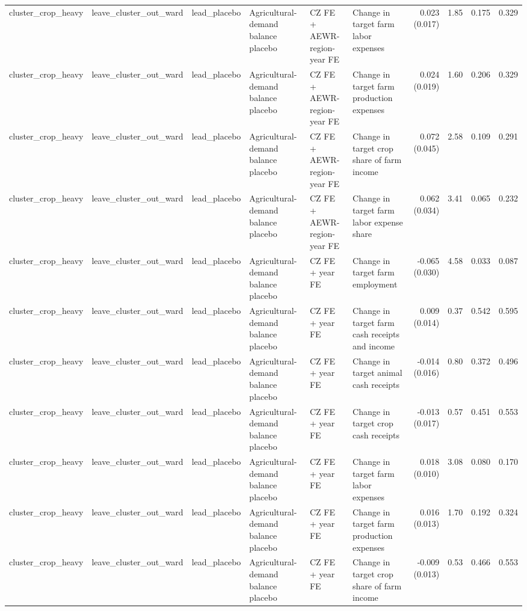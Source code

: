 \begin{tabular}{llllllrrrr}
cluster_crop_heavy & leave_cluster_out_ward & lead_placebo & Agricultural-demand balance placebo & CZ FE + AEWR-region-year FE & Change in target farm labor expenses & 0.023 (0.017) & 1.85 & 0.175 & 0.329 \\
cluster_crop_heavy & leave_cluster_out_ward & lead_placebo & Agricultural-demand balance placebo & CZ FE + AEWR-region-year FE & Change in target farm production expenses & 0.024 (0.019) & 1.60 & 0.206 & 0.329 \\
cluster_crop_heavy & leave_cluster_out_ward & lead_placebo & Agricultural-demand balance placebo & CZ FE + AEWR-region-year FE & Change in target crop share of farm income & 0.072 (0.045) & 2.58 & 0.109 & 0.291 \\
cluster_crop_heavy & leave_cluster_out_ward & lead_placebo & Agricultural-demand balance placebo & CZ FE + AEWR-region-year FE & Change in target farm labor expense share & 0.062 (0.034) & 3.41 & 0.065 & 0.232 \\
cluster_crop_heavy & leave_cluster_out_ward & lead_placebo & Agricultural-demand balance placebo & CZ FE + year FE & Change in target farm employment & -0.065 (0.030) & 4.58 & 0.033 & 0.087 \\
cluster_crop_heavy & leave_cluster_out_ward & lead_placebo & Agricultural-demand balance placebo & CZ FE + year FE & Change in target farm cash receipts and income & 0.009 (0.014) & 0.37 & 0.542 & 0.595 \\
cluster_crop_heavy & leave_cluster_out_ward & lead_placebo & Agricultural-demand balance placebo & CZ FE + year FE & Change in target animal cash receipts & -0.014 (0.016) & 0.80 & 0.372 & 0.496 \\
cluster_crop_heavy & leave_cluster_out_ward & lead_placebo & Agricultural-demand balance placebo & CZ FE + year FE & Change in target crop cash receipts & -0.013 (0.017) & 0.57 & 0.451 & 0.553 \\
cluster_crop_heavy & leave_cluster_out_ward & lead_placebo & Agricultural-demand balance placebo & CZ FE + year FE & Change in target farm labor expenses & 0.018 (0.010) & 3.08 & 0.080 & 0.170 \\
cluster_crop_heavy & leave_cluster_out_ward & lead_placebo & Agricultural-demand balance placebo & CZ FE + year FE & Change in target farm production expenses & 0.016 (0.013) & 1.70 & 0.192 & 0.324 \\
cluster_crop_heavy & leave_cluster_out_ward & lead_placebo & Agricultural-demand balance placebo & CZ FE + year FE & Change in target crop share of farm income & -0.009 (0.013) & 0.53 & 0.466 & 0.553 \\

\end{tabular}
